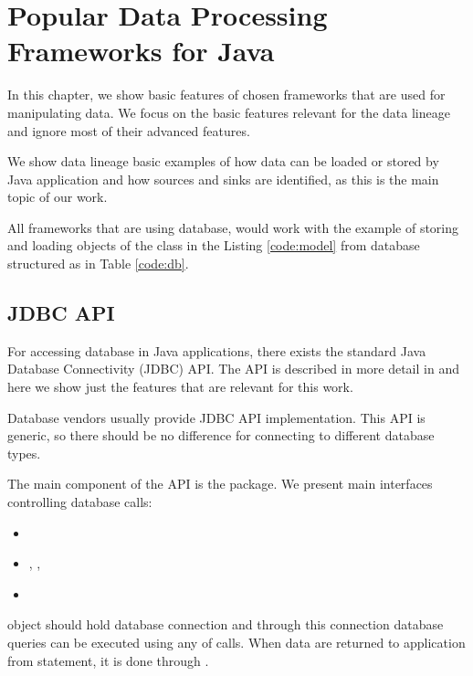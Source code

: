 
\chapter{Popular Data Processing Frameworks for Java \label{chapter:frameworks}}

In this chapter, we show basic features of chosen frameworks
that are used for manipulating data.
We focus on the basic features relevant for the data lineage
and ignore most of their advanced features.

We show data lineage basic examples of how data can be loaded or stored by Java application
and how sources and sinks are identified, as this is the main topic of our work.

All frameworks that are using database, would work with the example
of storing and loading objects of the class  in the Listing \ref{code:model}
from database structured as in Table \ref{code:db}.







\section{JDBC API \label{frameworks:jdbc}}

For accessing database in Java applications, there exists the standard
Java Database Connectivity (JDBC) API.
The API is described in more detail in \citet{JDBC_OVERVIEW}
and here we show just the features that are relevant for this work.

Database vendors usually provide JDBC API implementation. This API is generic, so
there should be no difference for connecting to different database types.

The main component of the API is the  \citep{java.sql} package.
We present main interfaces controlling database calls:
\begin{itemize}
  \item {}
  \item {}, , 
  \item {}
\end{itemize}

 object should hold database connection and through this connection
database queries can be executed using any of  calls.
When data are returned to application from statement, it is done through .

